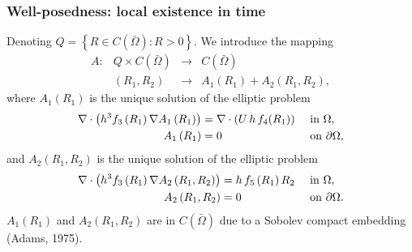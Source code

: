\documentclass[10pt,aspectratio=169]{beamer}
\newenvironment{nalign}{
	\begin{equation}
	\begin{aligned}
}{
	\end{aligned}
	\end{equation}
	\ignorespacesafterend
}
\newcommand{\cont}{C\left(\bar{\Omega}\right)}
\begin{document}

\begin{frame}
\frametitle{Well-posedness: local existence in time}
\vspace*{0.8cm}
Denoting $Q=\left\{R\in C\left(\bar{\Omega}\right):R>0\right\}$. We introduce the mapping
\begin{equation*}
\begin{array}{cccc}
A:&Q\times \cont&\longrightarrow& \cont\\
&(R_1,R_2)& \longrightarrow & A_1(R_1)+A_2\left(R_1,R_2\right),
\end{array}
\end{equation*}
where $A_1\left(R_1\right)$ is the unique solution of the elliptic problem
\begin{nalign}
\nabla\cdot \left(h^3f_3\left(R_1\right)\nabla A_1\left(R_1\right)\right)&=\nabla\cdot \left(U\,h\,f_4(R_1)\right)&&\textnormal{ in }\Omega,\\
A_1\left(R_1\right)&=0&&\textnormal{ on } \partial \Omega,
\label{eq:def-A1}
\end{nalign}
and $A_2\left(R_1,R_2\right)$ is the unique solution of the elliptic problem
\begin{equation}
\begin{aligned}
\nabla\cdot \left(h^3f_3\left(R_1\right)\nabla A_2\left(R_1,R_2\right)\right)&=h\,f_5\left(R_1\right)R_2
&&\textnormal{ in }\Omega,\\
A_2\left(R_1,R_2\right)&=0 &&\textnormal{ on } \partial \Omega.
\label{eq:def-A2}
\end{aligned}
\end{equation}
$A_1\left(R_1\right)$ and $A_2\left(R_1,R_2\right)$ are in $\cont$ due to a Sobolev compact embedding (Adams, 1975).
\end{frame} 

\end{document}

